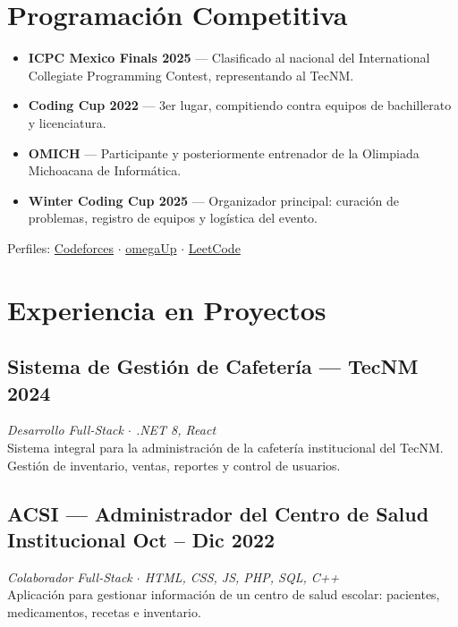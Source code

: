\documentclass[11pt, a4paper]{article}
\begin{document}
\section{Programación Competitiva}

\begin{itemize}
    \item \textbf{\small ICPC Mexico Finals 2025} --- Clasificado al nacional del International Collegiate Programming Contest, representando al TecNM.
    \item \textbf{\small Coding Cup 2022} --- 3er lugar, compitiendo contra equipos de bachillerato y licenciatura.
    \item \textbf{\small OMICH} --- Participante y posteriormente entrenador de la Olimpiada Michoacana de Informática.
    \item \textbf{\small Winter Coding Cup 2025} --- Organizador principal: curación de problemas, registro de equipos y logística del evento.
\end{itemize}

\vspace{0.1em}
{\footnotesize\color{secondary} Perfiles:
\href{https://codeforces.com/profile/Robert.x}{Codeforces} $\cdot$
\href{https://omegaup.com/profile/Robert.x}{omegaUp} $\cdot$
\href{https://leetcode.com/Robert0X}{LeetCode}}

\section{Experiencia en Proyectos}

\subsection[Cafeteria]{Sistema de Gestión de Cafetería --- TecNM \hfill \textnormal{\footnotesize\color{secondary}2024}}
\vspace{0.1em}
{\small\textit{\color{secondary}Desarrollo Full-Stack $\cdot$ .NET 8, React}}\\[3pt]
{\footnotesize Sistema integral para la administración de la cafetería institucional del TecNM. Gestión de inventario, ventas, reportes y control de usuarios.}

\subsection[ACSI]{ACSI --- Administrador del Centro de Salud Institucional \hfill \textnormal{\footnotesize\color{secondary}Oct -- Dic 2022}}
\vspace{0.1em}
{\small\textit{\color{secondary}Colaborador Full-Stack $\cdot$ HTML, CSS, JS, PHP, SQL, C++}}\\[3pt]
{\footnotesize Aplicación para gestionar información de un centro de salud escolar: pacientes, medicamentos, recetas e inventario.}
\end{document}
